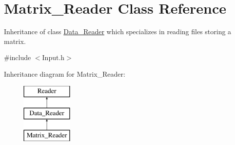 \hypertarget{class_matrix___reader}{}\section{Matrix\+\_\+\+Reader Class Reference}
\label{class_matrix___reader}


Inheritance of class \mbox{\hyperlink{class_data___reader}{Data\+\_\+\+Reader}} which specializes in reading files storing a matrix.  




{\ttfamily \#include $<$Input.\+h$>$}

Inheritance diagram for Matrix\+\_\+\+Reader\+:\begin{figure}[H]
\begin{center}
\leavevmode
\includegraphics[height=3.000000cm]{class_matrix___reader}
\end{center}
\end{figure}
